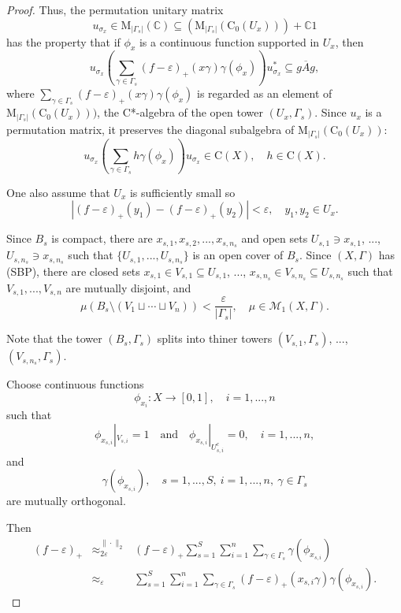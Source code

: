 \documentclass[12pt, oneside, psamsfonts]{amsart}
\theoremstyle{definition}
\theoremstyle{remark}
\numberwithin{equation}{section}
\newcommand{\norm}[1]{\| #1\|}
\newcommand{\abs}[1]{| #1 |}
\newcommand{\Comp}{\mathbb C}
\newcommand{\eps}{\varepsilon}
\begin{document}
\begin{proof}
Thus, the permutation unitary matrix $$u_{\sigma_x} \in \mathrm{M}_{\abs{\Gamma_s}}(\Comp) \subseteq (\mathrm{M}_{\abs{\Gamma_s}}(\mathrm{C_0}(U_x))) + \Comp 1$$ has the property that if $\phi_{x}$ is a continuous function supported in $U_x$, then 
\begin{equation}\label{into-u}
u_{\sigma_x} ( \sum_{\gamma \in \Gamma_s} (f - \eps)_+(x\gamma) \gamma(\phi_x) ) u^*_{\sigma_x} \subseteq \overline{gAg},
\end{equation}
where $\sum_{\gamma \in \Gamma_s} (f - \eps)_+(x\gamma) \gamma(\phi_x)$ is regarded as an element of $\mathrm{M}_{\abs{\Gamma_s}}(\mathrm{C_0}(U_x)))$, the C*-algebra of the open tower $(U_x, \Gamma_s)$.
Since $u_x$ is a permutation matrix, it preserves the diagonal subalgebra of $\mathrm{M}_{\abs{\Gamma_s}}(\mathrm{C}_0(U_x))$:
$$u_{\sigma_x} (\sum_{\gamma \in \Gamma_s} h \gamma(\phi_x) )u_{\sigma_x} \in \mathrm{C}(X),\quad h \in \mathrm{C}(X). $$

One also assume that $U_x$ is sufficiently small so $$\abs{(f - \eps)_+(y_1) - (f - \eps)_+(y_2)} < \eps,\quad y_1, y_2 \in U_x.$$

Since $B_s$ is compact, there are $x_{s, 1}, x_{s, 2}, ..., x_{s, n_s}$ and open sets $U_{s, 1} \ni x_{s, 1}$, ..., $U_{s, n_s} \ni x_{s, n_s}$ such that $\{U_{s, 1}, ..., U_{s, n_s}\}$ is an open cover of $B_s$. Since $(X, \Gamma)$ has (SBP), there are closed sets $x_{s, 1} \in V_{s, 1} \subseteq U_{s, 1}$, ..., $x_{s, n_s} \in V_{s, n_s} \subseteq U_{s, n_s}$ such that $V_{s, 1}, ..., V_{s, n}$ are mutually disjoint, and
$$\mu(B_s \setminus (V_1 \sqcup \cdots \sqcup V_n)) < \frac{\eps}{\abs{\Gamma_s}},\quad \mu \in \mathcal M_1(X, \Gamma).$$

Note that the tower $(B_s, \Gamma_s)$ splits into thiner towers $(V_{s, 1}, \Gamma_s)$, ..., $(V_{s, n_s}, \Gamma_s)$.

Choose continuous functions $$\phi_{x_i}: X \to [0, 1],\quad i=1, ..., n$$
such that
$$\phi_{x_{s, i}}|_{V_{s, i}} = 1 \quad \mathrm{and} \quad \phi_{x_{s, i}} |_{U_{s, i}^c} = 0,\quad i=1, ..., n,$$
and
$$ \gamma(\phi_{x_{s, i}}),\quad s=1, ..., S,\ i=1, ..., n,\ \gamma \in \Gamma_s$$
are mutually orthogonal.

Then
\begin{eqnarray*}
(f - \eps)_+ & \approx^{\norm{\cdot}_2}_{2 \eps} & (f- \eps)_+ \sum_{s=1}^S\sum_{i=1}^n \sum_{\gamma \in \Gamma_s} \gamma(\phi_{x_{s, i}}) \\
& \approx_\eps & \sum_{s = 1}^S \sum_{i=1}^n \sum_{\gamma \in \Gamma_s}  (f - \eps)_+(x_{s, i}\gamma) \gamma(\phi_{x_{s, i}}). 
\end{eqnarray*}


\end{proof}
\end{document}
